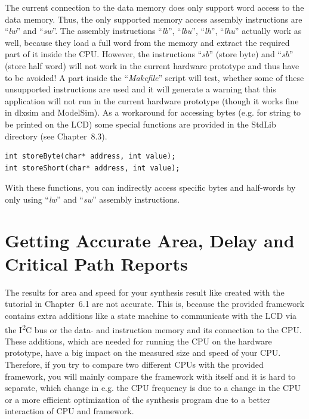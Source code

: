 The current connection to the data memory does only support word access
to the data memory. Thus, the only supported memory access assembly
instructions are ``\emph{lw}'' and ``\emph{sw}''. The assembly
instructions ``\emph{lb}'', ``\emph{lbu}'', ``\emph{lh}'',
``\emph{lhu}'' actually work as well, because they load a full word from
the memory and extract the required part of it inside the CPU. However,
the instructions ``\emph{sb}'' (store byte) and ``\emph{sh}'' (store
half word) will not work in the current hardware prototype and thus have
to be avoided! A part inside the ``\emph{Makefile}'' script will test,
whether some of these unsupported instructions are used and it will
generate a warning that this application will not run in the current
hardware prototype (though it works fine in dlxsim and ModelSim). As a
workaround for accessing bytes (e.g. for string to be printed on the
LCD) some special functions are provided in the StdLib directory (see
Chapter~8.3).
\begin{lstlisting}
int storeByte(char* address, int value);
int storeShort(char* address, int value);	
\end{lstlisting}


With these functions, you can indirectly access specific bytes and
half-words by only using ``\emph{lw}'' and ``\emph{sw}'' assembly
instructions.

\hypertarget{getting-accurate-area-delay-and-critical-path-reports}{%
\section{Getting Accurate Area, Delay and Critical Path
Reports}\label{getting-accurate-area-delay-and-critical-path-reports}}

The results for area and speed for your synthesis result like created
with the tutorial in Chapter~6.1 are not accurate. This is, because the
provided framework contains extra additions like a state machine to
communicate with the LCD via the I\textsuperscript{2}C bus or the data-
and instruction memory and its connection to the CPU. These additions,
which are needed for running the CPU on the hardware prototype, have a
big impact on the measured size and speed of your CPU. Therefore, if you
try to compare two different CPUs with the provided framework, you will
mainly compare the framework with itself and it is hard to separate,
which change in e.g. the CPU frequency is due to a change in the CPU or
a more efficient optimization of the synthesis program due to a better
interaction of CPU and framework.

